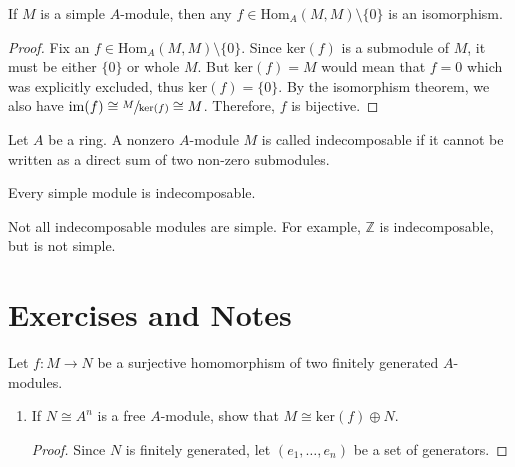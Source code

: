 \begin{example}
    If \(M\) is a simple \(A\)-module, then any \(f \in \mathrm{Hom}_A (M, M) \setminus \{0\}\) is an isomorphism.
\end{example}

\begin{proof}
    Fix an \(f \in \mathrm{Hom}_A (M, M) \setminus \{0\}\). Since \(\mathrm{ker}(f)\) is a submodule of \(M\), it must be either \(\{0\}\) or whole \(M\). But \(\mathrm{ker}(f) = M\) would mean that \(f = 0\) which was explicitly excluded, thus \(\mathrm{ker}(f) = \{0\}\). By the isomorphism theorem, we also have \(\mathrm{im}(f) \cong \sfrac{M}{\mathrm{ker}(f)} \cong M\). Therefore, \(f\) is bijective.
\end{proof}

\begin{defbox}
    \begin{definition}[Indecomposable]
        Let \(A\) be a ring. A nonzero \(A\)-module \(M\) is called indecomposable if it cannot be written as a direct sum of two non-zero submodules.
    \end{definition}
\end{defbox}

\begin{thmbox}
    \begin{proposition}
        Every simple module is indecomposable.
    \end{proposition}
\end{thmbox}

\begin{exmbox}
    \begin{example}
        Not all indecomposable modules are simple. For example, \(\mathbb{Z}\) is indecomposable, but is not simple.
    \end{example}
\end{exmbox}

\newpage
\section{Exercises and Notes}

\begin{example}
    Let \(f: M \rightarrow N\) be a surjective homomorphism of two finitely generated \(A\)-modules.

    \begin{enumerate}
        \item If \(N \cong A^n\) is a free \(A\)-module, show that \(M \cong \mathrm{ker}(f) \oplus N\).
        
        \begin{proof}
            Since \(N\) is finitely generated, let \((e_1, \ldots, e_n)\) be a set of generators. 
        \end{proof}
    \end{enumerate}
\end{example}

